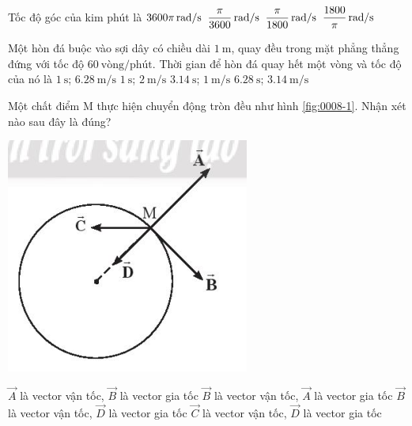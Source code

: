 \begin{ex}
	Tốc độ góc của kim phút là
	\choice
	{$\xsi{3600\pi}{\radian/\second}$}
	{$\xsi{\dfrac{\pi}{3600}}{\radian/\second}$}
	{\True $\xsi{\dfrac{\pi}{1800}}{\radian/\second}$}
	{$\xsi{\dfrac{1800}{\pi}}{\radian/\second}$}
\end{ex}
\begin{ex}
Một hòn đá buộc vào sợi dây có chiều dài $\SI{1}{\meter}$, quay đều trong mặt phẳng thẳng đứng với tốc độ $\SI{60}{\text{vòng}/\text{phút}}$. Thời gian để hòn đá quay hết một vòng và tốc độ của nó là	
	\choice
	{\True $\SI{1}{\second}$; $\SI{6.28}{\meter/\second}$}
	{$\SI{1}{\second}$; $\SI{2}{\meter/\second}$}
	{$\SI{3.14}{\second}$; $\SI{1}{\meter/\second}$}
	{$\SI{6.28}{\second}$; $\SI{3.14}{\meter/\second}$}
\end{ex}
\begin{ex}
	Một chất điểm M thực hiện chuyển động tròn đều như hình \ref{fig:0008-1}. Nhận xét nào sau đây là đúng?
	\begin{center}
		\includegraphics[width=0.3\linewidth]{../figs/0008-1VN10-2023-PH-TP0008-1}
		\label{fig:0008-1}
	\end{center}
	\choice
	{$\vec A$ là vector vận tốc, $\vec B$ là vector gia tốc}
	{$\vec B$ là vector vận tốc, $\vec A$ là vector gia tốc}
	{\True $\vec B$ là vector vận tốc, $\vec D$ là vector gia tốc}
	{$\vec C$ là vector vận tốc, $\vec D$ là vector gia tốc}
	\loigiai{}
\end{ex}
